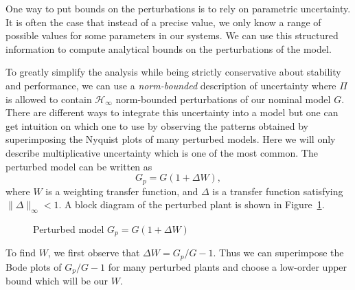 \documentclass[12pt,lot, lof]{puthesis}
\begin{document}
One way to put bounds on the perturbations is to rely on parametric uncertainty.
It is often the case that instead of a precise value, we only know a range of possible values for some parameters in our systems.
We can use this structured information to compute analytical bounds on the perturbations of the model.

To greatly simplify the analysis while being strictly conservative about stability and performance, we can use a \emph{norm-bounded} description of uncertainty where $\Pi$ is allowed to contain $\mathcal{H}_\infty$ norm-bounded perturbations of our nominal model $G$.
There are different ways to integrate this uncertainty into a model but one can get intuition on which one to use by observing the patterns obtained by superimposing the Nyquist plots of many perturbed models.
Here we will only describe multiplicative uncertainty which is one of the most common.
The perturbed model can be written as
\begin{equation} \label{eq:multiplicative}
	G_p = G (1 + \Delta W),
\end{equation}
where $W$ is a weighting transfer function, and $\Delta$ is a transfer function satisfying $\|\Delta\|_\infty < 1$.
A block diagram of the perturbed plant is shown in Figure~\ref{fig:example_multiplicative}.

\begin{figure}[htbp]
	\centering
	\caption{Perturbed model $G_p = G (1 + \Delta W)$}
	\label{fig:example_multiplicative}
\end{figure}

To find $W$, we first observe that $\Delta W = {G_p}/{G} - 1$.
Thus we can superimpose the Bode plots of ${G_p}/{G} - 1$ for many perturbed plants and choose a low-order upper bound which will be our $W$.
\end{document}
